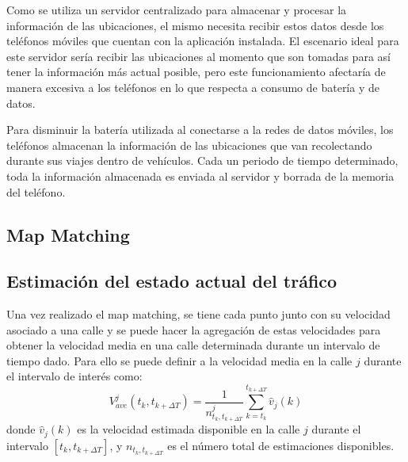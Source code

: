 Como se utiliza un servidor centralizado para almacenar y procesar la información de las ubicaciones, el mismo necesita recibir estos datos desde los teléfonos móviles que cuentan con la aplicación instalada. El escenario ideal para este servidor sería recibir las ubicaciones al momento que son tomadas para así tener la información más actual posible, pero este funcionamiento afectaría de manera excesiva a los teléfonos en lo que respecta a consumo de batería y de datos.

Para disminuir la batería utilizada al conectarse a la redes de datos móviles, los teléfonos almacenan la información de las ubicaciones que van recolectando durante sus viajes dentro de vehículos. Cada un periodo de tiempo determinado, toda la información almacenada es enviada al servidor y borrada de la memoria del teléfono.

\subsection{Map Matching}

\subsection{Estimación del estado actual del tráfico}

Una vez realizado el map matching, se tiene cada punto junto con su velocidad asociado a una calle y se puede hacer la agregación de estas velocidades para obtener la velocidad media en una calle determinada durante un intervalo de tiempo dado. Para ello se puede definir a la velocidad media en la calle $j$ durante el intervalo de interés como:
\begin{equation}
{ V }_{ ave }^{ j }({ t }_{ k },{ t }_{ k+\Delta T })=\frac { 1 }{ { n }_{ { t }_{ k },{ t }_{ k+\Delta T } }^{ j } } \sum_{ k={ t }_{ k } }^{ { t }_{ k+\Delta T } }{ \hat { { v } } _{ j }(k) }
\end{equation}
donde ${ \hat { { v } } _{ j }(k) }$ es la velocidad estimada disponible en la calle $j$ durante el intervalo $\left[ { t }_{ k },{ t }_{ k+\Delta T } \right] $, y ${ { n }_{ { t }_{ k },{ t }_{ k+\Delta T }}}$ es el número total de estimaciones disponibles.

